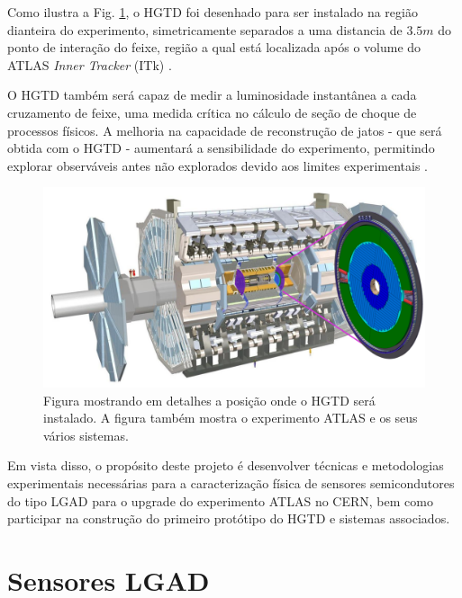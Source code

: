 Como ilustra a Fig. \ref{hgtd}, o HGTD foi desenhado para ser instalado na região dianteira do experimento, simetricamente separados a uma distancia de $3.5m$ do ponto de interação do feixe, região a qual está localizada após o volume do ATLAS {\it Inner Tracker} (ITk) \cite{tdr}.

\thispagestyle{plain}
O HGTD também será capaz de medir a luminosidade instantânea a cada cruzamento de feixe, uma medida crítica no cálculo de seção de choque de processos físicos. A melhoria na capacidade de reconstrução de jatos - que será obtida com o HGTD - aumentará a sensibilidade do experimento, permitindo explorar observáveis antes não explorados devido aos limites experimentais \cite{tdr}.

\thispagestyle{plain}
\begin{figure} 
    \centering
    \includegraphics[width=15.0cm]{assets/ATLAS_HGTD.png}
    \caption{ Figura mostrando em detalhes a posição onde o HGTD será instalado. A figura também mostra o experimento ATLAS e os seus vários sistemas.}
    \label{hgtd}
\end{figure}

Em vista disso, o propósito deste projeto é desenvolver técnicas e metodologias experimentais necessárias para a caracterização física de sensores semicondutores do tipo LGAD para o upgrade do experimento ATLAS no CERN, bem como participar na construção do primeiro protótipo do HGTD e sistemas associados.

\section{Sensores LGAD}

